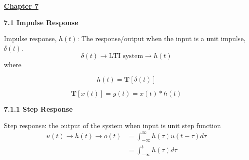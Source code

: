 \documentclass[landscape,a4paper]{extarticle}
\newcommand{\T}{\textbf{T}}
\begin{document}
\begin{multicols*}{5}
    \textbf{\uline{Chapter 7}}

    \textbf{7.1 Impulse Response}

    Impulse response, $h(t)$: The response/output when the input is a unit impulse, $\delta(t)$.
    \[
        \delta(t) \rightarrow \text{LTI system} \rightarrow h(t)
    \]
    where 

    \[
        h(t) = \T[\delta(t)] \tag{7.1}
    \]







    \[
        \T[x(t)] = y(t) = x(t) * h(t) \tag{7.5}
    \]

    \textbf{7.1.1 Step Response}

    Step response: the output of the system when input is unit step function
    \begin{align*}
        u(t) \rightarrow h(t) \rightarrow o(t) &= \int_{-\infty}^{\infty}h(\tau) u(t-\tau) d \tau\\
        &= \int_{-\infty}^{t}h(\tau) d \tau
    \end{align*}


\end{multicols*}
\end{document}
